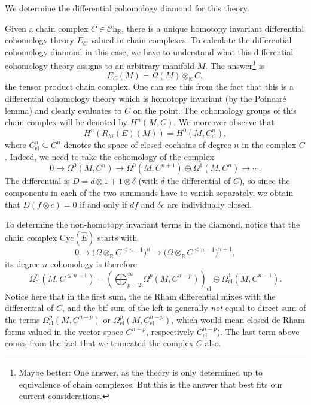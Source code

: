 \documentclass[a4paper]{book}
\newcommand{\lC}{\mathcal{C}}
\newcommand{\bR}{\mathbb{R}}
\newcommand{\Ch}{\lC\mathrm{h}} %
\theoremstyle{definition}
\theoremstyle{remark}
\numberwithin{equation}{section}
\begin{document}
We determine the differential cohomology diamond for this theory.
 
 \medskip

Given a chain complex $C \in \Ch_\bR$, there is a unique homotopy invariant differential cohomology theory $E_C$ valued in chain complexes. To calculate the differential cohomology diamond in this case, we have to understand what this differential cohomology theory assigns to an arbitrary manifold $M$. The answer\footnote{Maybe better: One answer, as the theory is only determined up to equivalence of chain complexes. But this is the answer that best fits our current considerations.} is
\[
E_C(M) = \Omega(M) \otimes_\bR C,
\]
the tensor product chain complex. One can see this from the fact that this is a differential cohomology theory which is homotopy invariant (by the Poincar\'e lemma) and clearly evaluates to $C$ on the point. The cohomology groups of this chain complex will be denoted by $H^n(M, C)$. We moreover observe that 
\[
H^n(R_{hi}(E)(M)) = H^0(M, C^n_{\mathrm{cl}}),
\]
where $C^n_{\mathrm{cl}} \subseteq C^n$ denotes the space of closed cochains of degree $n$ in the complex $C$. Indeed, we need to take the cohomology of the complex
\[
0 \longrightarrow \Omega^0(M, C^n) \longrightarrow \Omega^0(M, C^{n+1}) \oplus \Omega^1(M, C^n) \longrightarrow \cdots.
\]
The differential is $D = d\otimes 1 + 1 \otimes \delta$ (with $\delta$ the differential of $C$), so since the components in each of the two summands have to vanish separately, we obtain that $D(f \otimes c) = 0$ if and only if $df$ and $\delta c$ are individually closed.

To determine the non-homotopy invariant terms in the diamond, notice that the chain complex $\mathrm{Cyc}(\hat{E})$ starts with
\[
0 \longrightarrow \bigl(\Omega \otimes_\bR C^{\leq n-1}\bigr)^n \longrightarrow \bigl(\Omega \otimes_\bR C^{\leq n-1}\bigr)^{n+1},
\]
its degree $n$ cohomology is therefore
\[
\Omega_{\mathrm{cl}}^n(M, C^{\leq n-1}) = \left(\bigoplus_{p=2}^\infty \Omega^p(M, C^{n-p})\right)_{\mathrm{cl}} \oplus \Omega^1_{\mathrm{cl}}(M, C^{n-1}).
\]
Notice here that in the first sum, the de Rham differential mixes with the differential of $C$, and the bif sum of the left is generally \emph{not} equal to direct sum of the terms $\Omega^p_{\mathrm{cl}}(M, C^{n-p})$ or $\Omega^p_{\mathrm{cl}}(M, C_{\mathrm{cl}}^{n-p})$, which would mean closed de Rham forms valued in the vector space $C^{n-p}$, respectively $C^{n-p}_{\mathrm{cl}}$).
The last term above comes from the fact that we truncated the complex $C$ also.
\end{document}
